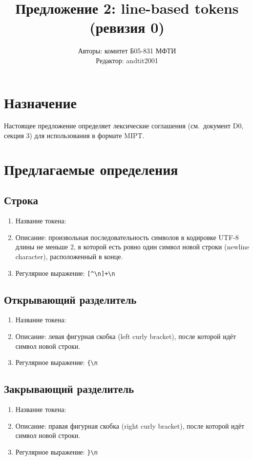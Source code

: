 \documentclass{article}
\title{Предложение 2: line-based tokens \\ (ревизия 0)}
\author{Авторы: комитет Б05-831 МФТИ \\ Редактор: andtit2001}
\date{\DTMdate{2019-11-07}}
\begin{document}
\maketitle
\tableofcontents
\pagebreak

\section{Назначение}
Настоящее предложение определяет лексические соглашения (см.~документ D0, секция 3) для использования в формате MIPT.

\section{Предлагаемые определения}
\subsection{Строка}
\begin{enumerate}
	\item Название токена: 
	\item Описание: произвольная последовательность символов в кодировке UTF-8 длины не меньше 2, в которой есть ровно один символ новой строки (newline character), расположенный в конце.
	\item Регулярное выражение: \verb/[^\n]+\n/
\end{enumerate}

\subsection{Открывающий разделитель}
\begin{enumerate}
	\item Название токена: 
	\item Описание: левая фигурная скобка (left curly bracket), после которой идёт символ новой строки.
	\item Регулярное выражение: \verb/{\n/
\end{enumerate}

\subsection{Закрывающий разделитель}
\begin{enumerate}
	\item Название токена: 
	\item Описание: правая фигурная скобка (right curly bracket), после которой идёт символ новой строки.
	\item Регулярное выражение: \verb/}\n/
\end{enumerate}
\end{document}
